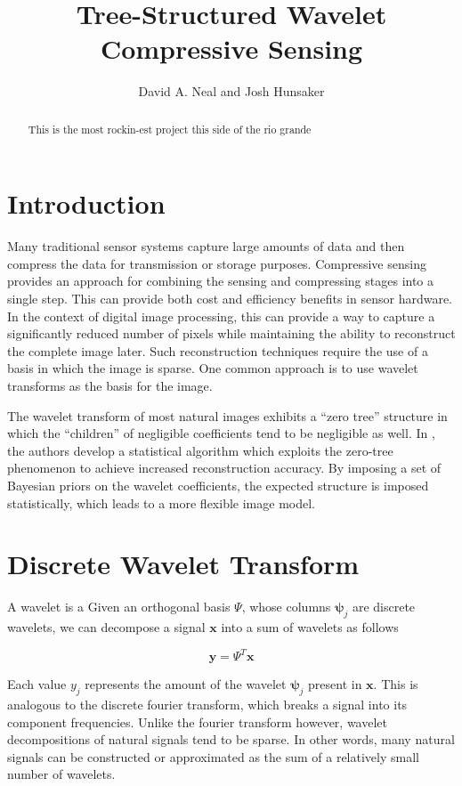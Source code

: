 \documentclass{IEEEtran}
\title{Tree-Structured Wavelet Compressive Sensing}
\author{David A. Neal and Josh Hunsaker}
\newcommand{\bfx}{\mathbf{x}}
\newcommand{\bfy}{\mathbf{y}}
\newcommand{\bfpsi}{\mathbf{\psi}}
\begin{document}
\maketitle

\begin{abstract}
This is the most rockin-est project this side of the rio grande
\end{abstract}

\section{Introduction}

Many traditional sensor systems capture large amounts of data and then compress the data for transmission or storage purposes.  Compressive sensing provides an approach for combining the sensing and compressing stages into a single step.  This can provide both cost and efficiency benefits in sensor hardware. In the context of digital image processing, this can provide a way to capture a significantly reduced number of pixels while maintaining the ability to reconstruct the complete image later. Such reconstruction techniques require the use of a basis in which the image is sparse. One common approach is to use wavelet transforms as the basis for the image.

The wavelet transform of most natural images exhibits a ``zero tree'' structure in which the ``children'' of negligible coefficients tend to be negligible as well. In \cite{He09}, the authors develop a statistical algorithm which exploits the zero-tree phenomenon to achieve increased reconstruction accuracy. By imposing a set of Bayesian priors on the wavelet coefficients, the expected structure is imposed statistically, which leads to a more flexible image model.

\section{Discrete Wavelet Transform}

A wavelet is a 
Given an orthogonal basis $\Psi$, whose columns $\bfpsi_j$ are discrete wavelets, we can decompose a signal $\bfx$ into a sum of wavelets as follows

\begin{equation}
  \label{eq:}
  \bfy = \Psi^T \bfx
\end{equation}

Each value $y_j$ represents the amount of the wavelet $\bfpsi_j$ present in $\bfx$. This is analogous to the discrete fourier transform, which breaks a signal into its component frequencies. Unlike the fourier transform however, wavelet decompositions of natural signals tend to be sparse.  In other words, many natural signals can be constructed or approximated as the sum of a relatively small number of wavelets.
\end{document}
